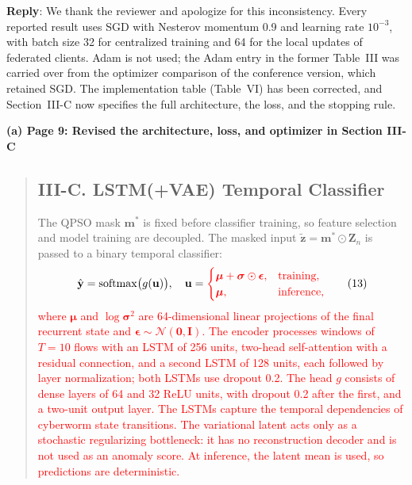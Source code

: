 \documentclass[11pt]{article}
\newenvironment{excerpt}{\begin{quote}\sloppy}{\end{quote}}
\newcommand{\reply}{\noindent\textbf{Reply}: }
\newcommand{\mshead}[2]{\subsection*{\textbf{#1. #2}}}
\newcommand{\loc}[1]{\par\medskip\noindent\textbf{#1}\par}
\begin{document}
\reply We thank the reviewer and apologize for this inconsistency. Every
reported result uses SGD with Nesterov momentum 0.9 and learning rate
$10^{-3}$, with batch size 32 for centralized training and 64 for the local
updates of federated clients. Adam is not used; the Adam entry in the former
Table~III was carried over from the optimizer comparison of the conference
version, which retained SGD. The implementation table (Table~VI) has been
corrected, and Section~III-C now specifies the full architecture, the loss,
and the stopping rule.

\loc{(a) Page 9: Revised the architecture, loss, and optimizer in Section III-C}
\begin{excerpt}
\mshead{III-C}{LSTM(+VAE) Temporal Classifier}


The QPSO mask $\mathbf{m}^{*}$ is fixed before classifier training,
so feature selection and model training are decoupled. The masked
input $\tilde{\mathbf{z}}=\mathbf{m}^{*}\odot\mathbf{Z}_n$ is passed
to a binary temporal classifier:
\begin{equation}
\hat{\mathbf{y}} = \mathrm{softmax}\bigl(g(\mathbf{u})\bigr),\quad
\mathbf{u} = \textcolor{red}{\begin{cases}
\boldsymbol{\mu}+\boldsymbol{\sigma}\odot\boldsymbol{\epsilon}, & \text{training},\\
\boldsymbol{\mu}, & \text{inference},
\end{cases}}
\tag{13}
\end{equation}
\textcolor{red}{where $\boldsymbol{\mu}$ and
$\log\boldsymbol{\sigma}^2$ are 64-dimensional linear projections of
the final recurrent state and
$\boldsymbol{\epsilon}\sim\mathcal{N}(\mathbf{0},\mathbf{I})$. The
encoder processes windows of $T=10$ flows with an LSTM of 256 units,
two-head self-attention with a residual connection, and a second LSTM
of 128 units, each followed by layer normalization; both LSTMs use
dropout 0.2. The head $g$ consists of dense layers of 64 and 32 ReLU
units, with dropout 0.2 after the first, and a two-unit output layer.
The LSTMs capture the temporal dependencies of cyberworm state
transitions. The variational latent acts only as a stochastic
regularizing bottleneck: it has no reconstruction decoder and is not
used as an anomaly score. At inference, the latent mean is used, so
predictions are deterministic.}
\end{excerpt}
\end{document}

